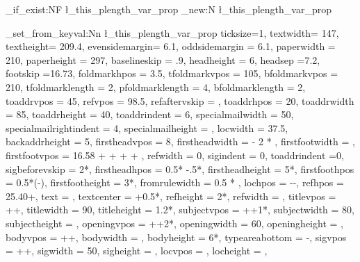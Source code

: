 \prop_if_exist:NF \l_this_plength_var_prop {
  \prop_new:N \l_this_plength_var_prop
}

\prop_set_from_keyval:Nn \l_this_plength_var_prop {
  ticksize=1,
  textwidth= 147,
  textheight= 209.4,
  evensidemargin= 6.1,
  oddsidemargin = 6.1,
  paperwidth = 210,
  paperheight = 297,
  baselineskip = .9\baselineskip, %
  headheight     =  6,
  headsep        =7.2,
  footskip       =16.73,
  foldmarkhpos = 3.5,
  tfoldmarkvpos = 105,
  bfoldmarkvpos = 210,
  tfoldmarklength = 2,
  pfoldmarklength = 4,
  bfoldmarklength = 2,
  toaddrvpos = 45,
  refvpos = 98.5,
  refaftervskip = ,
  toaddrhpos = 20,
  toaddrwidth = 85,
  toaddrheight = 40,
  toaddrindent = 6,
  specialmailwidth = 50,
  specialmailrightindent = 4,
  specialmailheight = ,
  locwidth = 37.5,
  backaddrheight = 5,
  firstheadvpos = 8,
  firstheadwidth =  - 2 * ,
  firstfootwidth = ,
  firstfootvpos =  16.58 +  +  +  + ,
  refwidth = 0,
  sigindent = 0,
  toaddrindent =0,
  sigbeforevskip = 2*,
  firstheadhpos = 0.5* -.5*,
  firstheadheight = 5*,
  firstfoothpos = 0.5*(-),
  firstfootheight = 3*,
  fromrulewidth = 0.5 * ,
  lochpos = --,
  refhpos = 25.40+,
  text = ,
  textcenter = +0.5*,
  refheight = 2*,
  refwidth = ,
  titlevpos = ++,
  titlewidth = 90,
  titleheight = 1.2*,
  subjectvpos = ++1*,
  subjectwidth = 80,
  subjectheight = ,
  openingvpos = ++2*,
  openingwidth = 60,
  openingheight = ,
  bodyvpos = ++,
  bodywidth = ,
  bodyheight = 6*,
  typeareabottom = -,
  sigvpos = ++,
  sigwidth = 50,
  sigheight = ,
  locvpos = ,
  locheight = ,
}
\def\UseVar#1{
  \fp_eval:n {\prop_item:Nn \l_this_plength_var_prop {#1}}
}

